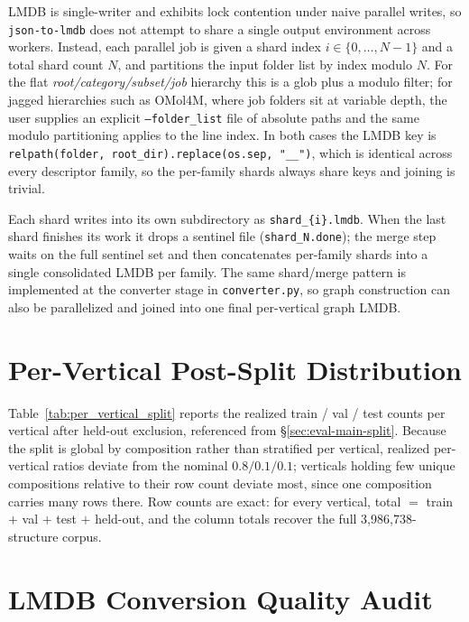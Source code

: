 LMDB is single-writer and exhibits lock contention under naive parallel writes, so
\texttt{json-to-lmdb} does not attempt to share a single output environment across workers.
Instead, each parallel job is given a shard index $i \in \{0, \dots, N-1\}$ and a total shard
count $N$, and partitions the input folder list by index modulo $N$. For the flat
\textit{root/category/subset/job} hierarchy this is a glob plus a modulo filter; for jagged
hierarchies such as OMol4M, where job folders sit at variable depth, the user supplies an
explicit \texttt{--folder\_list} file of absolute paths and the same modulo partitioning
applies to the line index. In both cases the LMDB key is
\texttt{relpath(folder, root\_dir).replace(os.sep, "\_\_")}, which is identical across every
descriptor family, so the per-family shards always share keys and joining is trivial.

Each shard writes into its own subdirectory as \texttt{shard\_\{i\}.lmdb}. When the last
shard finishes its work it drops a sentinel file (\texttt{shard\_N.done}); the merge step
waits on the full sentinel set and then concatenates per-family shards into a single
consolidated LMDB per family. The same shard/merge pattern is implemented at the converter
stage in \texttt{converter.py}, so graph construction can also be parallelized and joined
into one final per-vertical graph LMDB.


\begingroup\color{revcolor}
\section{Per-Vertical Post-Split Distribution}
\label{app:post_split}

Table~\ref{tab:per_vertical_split} reports the realized train / val / test counts
per vertical after held-out exclusion, referenced from
\S\ref{sec:eval-main-split}. Because the split is global by composition rather
than stratified per vertical, realized per-vertical ratios deviate from the
nominal $0.8 / 0.1 / 0.1$; verticals holding few unique compositions relative to
their row count deviate most, since one composition carries many rows there.
Row counts are exact: for every vertical, total $=$ train $+$ val $+$ test $+$
held-out, and the column totals recover the full 3{,}986{,}738-structure corpus.


\endgroup

\section{LMDB Conversion Quality Audit}
\label{app:lmdb_audit}

